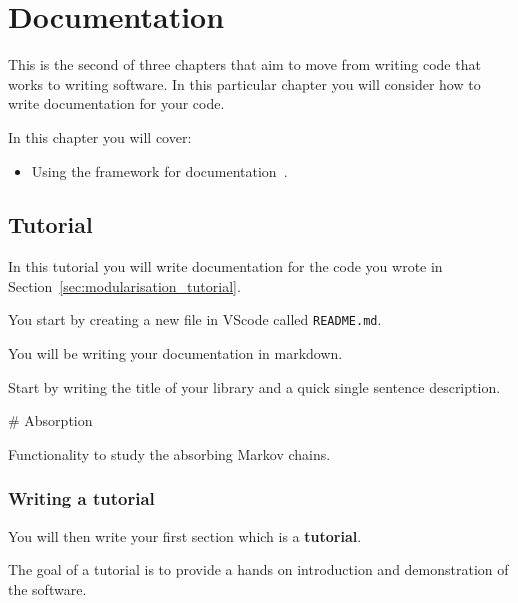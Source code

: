 \chapter{Documentation}
\label{chp:documentation} 

This is the second of three chapters that aim to move from writing code
that works to writing software. In this particular chapter you will consider how
to write documentation for your code.

\begin{note}
In this chapter you will cover:
\begin{itemize}
\item 

Using the  framework for
documentation~\cite{Procida_Diataxis_documentation_framework}.

\end{itemize}
\end{note}




\section{Tutorial}
\label{sec:documentation_tutorial}

In this tutorial you will write documentation for the code
you wrote in Section~\ref{sec:modularisation_tutorial}.


You start by creating a new file in VScode called \texttt{README.md}.

\begin{note}
You will be writing your documentation in markdown.
\end{note}


Start by writing the title of your library and a quick single sentence
description.

\begin{md}
# Absorption

Functionality to study the absorbing Markov chains.
\end{md}


\subsection{Writing a tutorial}
\label{\detokenize{building-tools/06-documentation/tutorial/main:writing-a-tutorial}}

You will then write your first section which is a \textbf{tutorial}.

\begin{note}
The goal of a tutorial is to provide a hands on introduction and demonstration
of the software.
\end{note}

